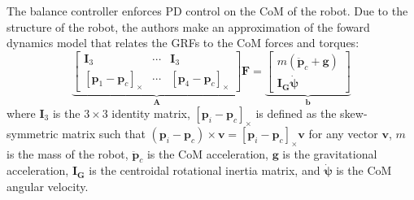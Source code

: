 \documentclass[12pt,a4paper]{article}
\theoremstyle{plain}
\theoremstyle{definition}
\theoremstyle{remark}
\begin{document}
The balance controller enforces PD control on the CoM of the robot. Due to the structure of the robot, the authors make an approximation of the foward dynamics model that relates the GRFs to the CoM forces and torques:
\begin{equation}
    \underbrace{\begin{bmatrix}
        \mathbf{I}_3 & \cdots & \mathbf{I}_3 \\
        \left[\mathbf{p}_1 - \mathbf{p}_c\right]_\times & \cdots & \left[\mathbf{p}_4 - \mathbf{p}_c\right]_\times
    \end{bmatrix}}_{\mathbf{A}}
\mathbf{F}
=
\underbrace{\begin{bmatrix}
    m(\ddot{\mathbf{p}}_c + \mathbf{g}) \\[4pt]
    \mathbf{I_G} \mathbf{\dot{\psi}}
\end{bmatrix}}_{\mathbf{b}}
\end{equation}
where $\mathbf{I}_3$ is the $3 \times 3$ identity matrix, $\left[\mathbf{p}_i - \mathbf{p}_c\right]_\times$ is defined as the skew-symmetric matrix such that $(\mathbf{p}_i - \mathbf{p}_c) \times \mathbf{v} = \left[\mathbf{p}_i - \mathbf{p}_c\right]_\times \mathbf{v}$ for any vector $\mathbf{v}$, $m$ is the mass of the robot, $\ddot{\mathbf{p}}_c$ is the CoM acceleration, $\mathbf{g}$ is the gravitational acceleration, $\mathbf{I_G}$ is the centroidal rotational inertia matrix, and $\mathbf{\dot{\psi}}$ is the CoM angular velocity. 
\end{document}
